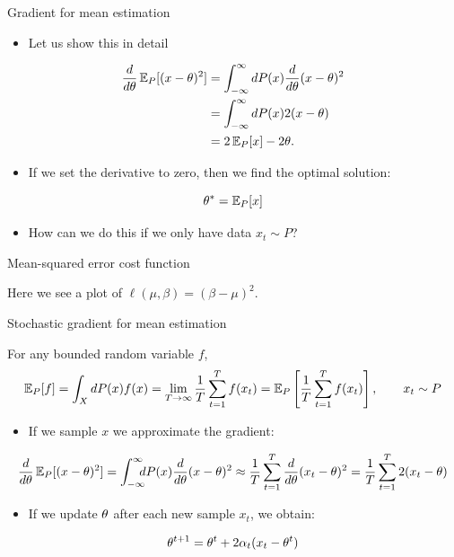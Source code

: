 \documentclass[smaller]{beamer}
\begin{document}
\begin{frame}[label={sec:orgddfac0f}]{Gradient for mean estimation}
\begin{itemize}
\item Let us show this in detail
\end{itemize}
\begin{align*}
 \frac{d}{d\theta} \mathop{\mbox{\ensuremath{\mathbb{E}}}}\nolimits_P [(x - \theta)^2] 
&= \int_{-\infty}^\infty dP(x) \frac{d}{d\theta} (x - \theta)^2
\\
&=  \int_{-\infty}^\infty dP(x) 2(x - \theta)
\\
&=  2 \mathop{\mbox{\ensuremath{\mathbb{E}}}}\nolimits_P[x] - 2\theta.
\end{align*}
\begin{itemize}
\item If we set the derivative to zero, then we find the optimal solution:
\end{itemize}
\[
\theta^* = \mathop{\mbox{\ensuremath{\mathbb{E}}}}\nolimits_P[x]
\]
\begin{itemize}
\item How can we do this if we only have data \(x_t \sim P\)?
\end{itemize}
\end{frame}
\begin{frame}[label={sec:orgf62cf2f}]{Mean-squared error cost function}
Here we see a plot of \(\ell(\mu, \beta) = (\beta - \mu)^2\).
\end{frame}
\begin{frame}[label={sec:org1d6a32b}]{Stochastic gradient for mean estimation}
\begin{theorem}[Sampling]
For any bounded random variable \(f\), 
\[
\mathop{\mbox{\ensuremath{\mathbb{E}}}}\nolimits_P[f] = \int_{X} dP(x) f(x)
 = 
\lim_{T \to \infty} \frac{1}{T} \sum_{t=1}^T f(x_t)
 = 
\mathop{\mbox{\ensuremath{\mathbb{E}}}}\nolimits_P \left[\frac{1}{T} \sum_{t=1}^T f(x_t)\right]
, \qquad x_t \sim P
\]
\end{theorem}
\begin{example}[Sampling]
\begin{itemize}
\item If we sample \(x\) we approximate the gradient:
\end{itemize}
\begin{align*}
 \frac{d}{d\theta} \mathop{\mbox{\ensuremath{\mathbb{E}}}}\nolimits_P [(x - \theta)^2] 
= \int_{-\infty}^\infty \!\!\!\! dP(x) \frac{d}{d\theta} (x - \theta)^2
\approx \frac{1}{T} \sum_{t=1}^T \frac{d}{d\theta} (x_t - \theta)^2
= \frac{1}{T} \sum_{t=1}^T 2(x_t - \theta)
\end{align*}
\pause
\begin{itemize}
\item If we update \(\theta\) after each new sample \(x_t\), we obtain:
\end{itemize}
\[
\theta^{t+1} = \theta^t + 2 \alpha_t (x_t - \theta^t)
\]
\end{example}
\end{frame}
\end{document}
